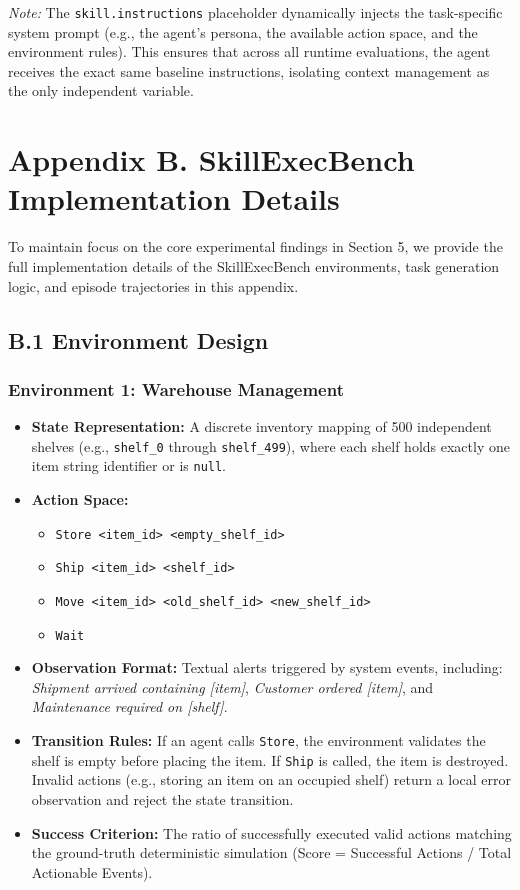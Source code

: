 \documentclass[11pt]{article}
\begin{document}
\textit{Note:} The \texttt{{skill.instructions}} placeholder dynamically injects the task-specific system prompt (e.g., the agent's persona, the available action space, and the environment rules). This ensures that across all runtime evaluations, the agent receives the exact same baseline instructions, isolating context management as the only independent variable.


\section*{Appendix B. SkillExecBench Implementation Details}
\label{appendix:skillexecbench}

To maintain focus on the core experimental findings in Section 5, we provide the full implementation details of the SkillExecBench environments, task generation logic, and episode trajectories in this appendix.

\subsection*{B.1 Environment Design}

\subsubsection*{Environment 1: Warehouse Management}
\begin{itemize}
    \item \textbf{State Representation:} A discrete inventory mapping of 500 independent shelves (e.g., \texttt{shelf\_0} through \texttt{shelf\_499}), where each shelf holds exactly one item string identifier or is \texttt{null}.
    \item \textbf{Action Space:} 
        \begin{itemize}
            \item \texttt{Store <item\_id> <empty\_shelf\_id>}
            \item \texttt{Ship <item\_id> <shelf\_id>}
            \item \texttt{Move <item\_id> <old\_shelf\_id> <new\_shelf\_id>}
            \item \texttt{Wait}
        \end{itemize}
    \item \textbf{Observation Format:} Textual alerts triggered by system events, including: \textit{Shipment arrived containing [item]}, \textit{Customer ordered [item]}, and \textit{Maintenance required on [shelf]}.
    \item \textbf{Transition Rules:} If an agent calls \texttt{Store}, the environment validates the shelf is empty before placing the item. If \texttt{Ship} is called, the item is destroyed. Invalid actions (e.g., storing an item on an occupied shelf) return a local error observation and reject the state transition.
    \item \textbf{Success Criterion:} The ratio of successfully executed valid actions matching the ground-truth deterministic simulation (Score = Successful Actions / Total Actionable Events).
\end{itemize}
\end{document}
